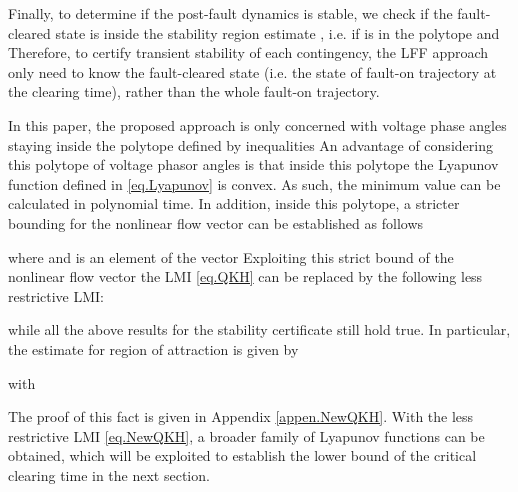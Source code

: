 \documentclass[final]{IEEEtran}
\begin{document}
Finally, to determine if the post-fault dynamics is stable, we
check if the fault-cleared state   is inside the stability
region estimate , i.e. if  is in the polytope
 and  Therefore, to certify
transient stability of each contingency, the LFF approach only
need to know the fault-cleared state  (i.e. the state of
fault-on trajectory at the clearing time), rather than the whole
fault-on trajectory.

In this paper, the proposed approach is only concerned with
voltage phase angles staying inside the polytope 
defined by inequalities  An advantage of considering this polytope of
voltage phasor angles is that inside this polytope the Lyapunov
function  defined in \eqref{eq.Lyapunov} is convex. As such,
the minimum value  can be calculated in polynomial time.
In addition, inside this polytope, a stricter bounding for the
nonlinear flow vector  can be established as follows

where  and
 is an element of
the vector  Exploiting this strict bound of the nonlinear flow
vector  the LMI \eqref{eq.QKH} can be replaced by the
following less restrictive LMI:

while all the above results for the stability certificate still
hold true. In particular, the estimate for region of attraction is
given by

with

The proof of this fact is given in Appendix \ref{appen.NewQKH}.
With the less restrictive LMI \eqref{eq.NewQKH}, a broader family
of Lyapunov functions can be obtained, which will be exploited to
establish the lower bound of the critical clearing time in the
next section.
\end{document}
